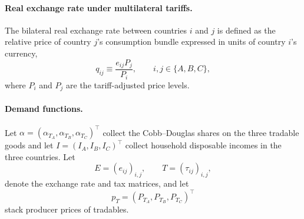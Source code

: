 \documentclass[11pt]{article}
\begin{document}
\paragraph{Real exchange rate under multilateral tariffs.} 
The bilateral real exchange rate between countries $i$ and $j$ is defined as the relative price of country $j$’s consumption bundle expressed in units of country $i$’s currency,
\begin{equation}
q_{ij} \equiv \frac{e_{ij} P_j}{P_i}, \qquad i,j \in \{A,B,C\},
\label{eq:rer_tariffs}
\end{equation}
where $P_i$ and $P_j$ are the tariff-adjusted price levels.





\paragraph{Demand functions.}
Let $\alpha = (\alpha_{T_A},\alpha_{T_B},\alpha_{T_C})^\top$ collect the 
Cobb--Douglas shares on the three tradable goods and let 
$I = (I_A,I_B,I_C)^\top$ collect household disposable incomes in the three countries. 
Let
\begin{equation}
E = (e_{ij})_{i,j}, 
\qquad 
T = (\tau_{ij})_{i,j},
\end{equation}
denote the exchange rate and tax matrices, and let 
\begin{equation}
p_T = (P_{T_A},P_{T_B},P_{T_C})^\top
\end{equation}
stack producer prices of tradables.
\end{document}
